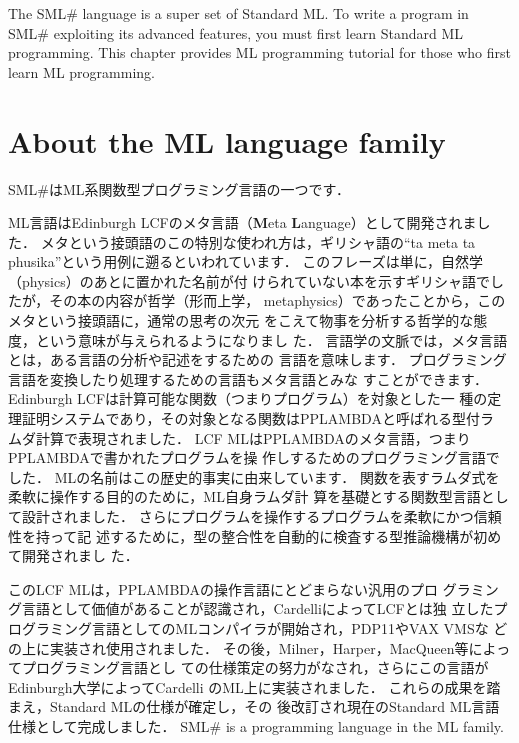 \documentclass{jbook}
\newif\ifjp
\newcommand{\txt}[2]{#2}
\newcommand{\smlsharp}{SML\#}
\begin{document}
\ifjp%
	\smlsharp{}言語は，Standard ML言語と後方互換性のあるプログラミン
グ言語です．
	\smlsharp{}の高度な機能を使いこなすために，本章でまず，Standard
MLプログラミングの基礎を学びましょう．

\else%
	The \smlsharp{} language is a super set of Standard ML.
	To write a program in \smlsharp{} exploiting its advanced
features, you must first learn Standard ML programming.
	This chapter provides ML programming tutorial for those who
first learn ML programming.


\fi%

\section{\txt{ML言語について}{About the ML language family}}
\label{sec:tutorialMllanguage}

\ifjp%
	\smlsharp{}はML系関数型プログラミング言語の一つです．

	ML言語はEdinburgh LCF\cite{gord79}のメタ言語（{\bf M}eta {\bf
L}anguage）として開発されました．
	メタという接頭語のこの特別な使われ方は，ギリシャ語の``ta meta ta
phusika''という用例に遡るといわれています．
	このフレーズは単に，自然学（physics）のあとに置かれた名前が付
けられていない本を示すギリシャ語でしたが，その本の内容が哲学（形而上学，
metaphysics）であったことから，このメタという接頭語に，通常の思考の次元
をこえて物事を分析する哲学的な態度，という意味が与えられるようになりまし
た．
	言語学の文脈では，メタ言語とは，ある言語の分析や記述をするための
言語を意味します．
	プログラミング言語を変換したり処理するための言語もメタ言語とみな
すことができます．
	Edinburgh LCFは計算可能な関数（つまりプログラム）を対象とした一
種の定理証明システムであり，その対象となる関数はPPLAMBDAと呼ばれる型付ラ
ムダ計算で表現されました．
	LCF MLはPPLAMBDAのメタ言語，つまりPPLAMBDAで書かれたプログラムを操
作しするためのプログラミング言語でした．
	MLの名前はこの歴史的事実に由来しています．
	関数を表すラムダ式を柔軟に操作する目的のために，ML自身ラムダ計
算を基礎とする関数型言語として設計されました．
	さらにプログラムを操作するプログラムを柔軟にかつ信頼性を持って記
述するために，型の整合性を自動的に検査する型推論機構が初めて開発されまし
た．

	このLCF MLは，PPLAMBDAの操作言語にとどまらない汎用のプロ
グラミング言語として価値があることが認識され，CardelliによってLCFとは独
立したプログラミング言語としてのMLコンパイラが開始され，PDP11やVAX VMSな
どの上に実装され使用されました．
	その後，Milner，Harper，MacQueen等によってプログラミング言語とし
ての仕様策定の努力がなされ，さらにこの言語がEdinburgh大学によってCardelli
のML上に実装されました．
	これらの成果を踏まえ，Standard MLの仕様\cite{sml}が確定し，その
後改訂され現在のStandard ML言語仕様\cite{sml97}として完成しました．
\else%
	\smlsharp{} is a programming language in the ML family.
\end{document}
